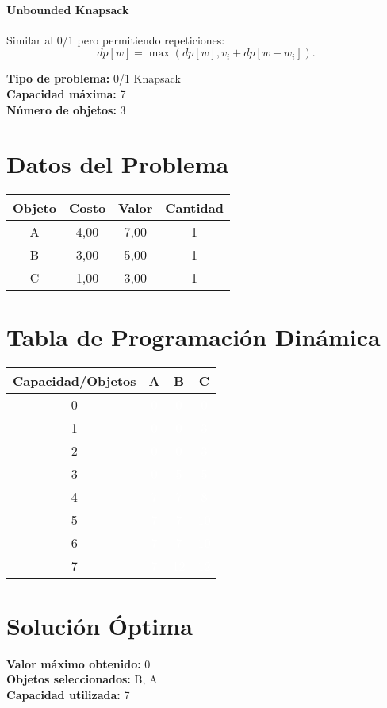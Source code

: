 \documentclass{article}
\begin{document}
\paragraph{Unbounded Knapsack} Similar al 0/1 pero permitiendo repeticiones:
\[
dp[w] = \max ( dp[w], v_i + dp[w - w_i] ).
\]

\thispagestyle{empty}
\newpage
\textbf{Tipo de problema:} 0/1 Knapsack\\
\textbf{Capacidad máxima:} 7\\
\textbf{Número de objetos:} 3\\

\section*{Datos del Problema}
\begin{tabular}{|c|c|c|c|}
\hline
Objeto & Costo & Valor & Cantidad \\
\hline
A & 4,00 & 7,00 & 1 \\
B & 3,00 & 5,00 & 1 \\
C & 1,00 & 3,00 & 1 \\
\hline
\end{tabular}

\section*{Tabla de Programación Dinámica}
\begin{center}
\scriptsize
\begin{tabular}{|c|c|c|c|}
\hline
Capacidad/Objetos & A & B & C \\ \hline
0 & \cellcolor{rojo}\textcolor{white}{0} & \cellcolor{rojo}\textcolor{white}{0} & \cellcolor{rojo}\textcolor{white}{0} \\ \hline
1 & \cellcolor{rojo}\textcolor{white}{0} & \cellcolor{rojo}\textcolor{white}{0} & \cellcolor{verde}\textcolor{white}{3} \\ \hline
2 & \cellcolor{rojo}\textcolor{white}{0} & \cellcolor{rojo}\textcolor{white}{0} & \cellcolor{verde}\textcolor{white}{3} \\ \hline
3 & \cellcolor{rojo}\textcolor{white}{0} & \cellcolor{verde}\textcolor{white}{5} & \cellcolor{rojo}\textcolor{white}{5} \\ \hline
4 & \cellcolor{verde}\textcolor{white}{7} & \cellcolor{rojo}\textcolor{white}{7} & \cellcolor{verde}\textcolor{white}{8} \\ \hline
5 & \cellcolor{verde}\textcolor{white}{7} & \cellcolor{rojo}\textcolor{white}{7} & \cellcolor{verde}\textcolor{white}{10} \\ \hline
6 & \cellcolor{verde}\textcolor{white}{7} & \cellcolor{rojo}\textcolor{white}{7} & \cellcolor{verde}\textcolor{white}{10} \\ \hline
7 & \cellcolor{verde}\textcolor{white}{7} & \cellcolor{verde}\textcolor{white}{12} & \cellcolor{rojo}\textcolor{white}{12} \\ \hline
\end{tabular}
\end{center}
\normalsize

\section*{Solución Óptima}
\textbf{Valor máximo obtenido:} 0\\
\textbf{Objetos seleccionados:} B, A\\
\textbf{Capacidad utilizada:} 7\\
\end{document}
